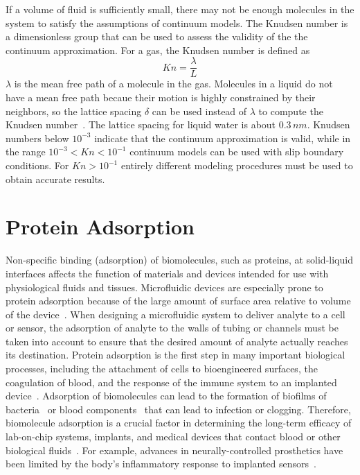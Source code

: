 If a volume of fluid is sufficiently small, there may not be enough
molecules in the system to satisfy the assumptions of continuum models.
The Knudsen number is a dimensionless group that can be used to assess
the validity of the the continuum approximation. For a gas, the Knudsen
number is defined as\[
Kn=\frac{\lambda}{L}\]
$\lambda$ is the mean free path of a molecule in the gas. Molecules
in a liquid do not have a mean free path becaue their motion is highly
constrained by their neighbors, so the lattice spacing $\delta$ can
be used instead of $\lambda$ to compute the Knudsen number~\cite{Sharp2002}.
The lattice spacing for liquid water is about $0.3\, nm$. Knudsen
numbers below $10^{-3}$ indicate that the continuum approximation
is valid, while in the range $10^{-3}<Kn<10^{-1}$ continuum models
can be used with slip boundary conditions. For $Kn>10^{-1}$ entirely
different modeling procedures must be used to obtain accurate results.


\section{Protein Adsorption}

Non-specific binding (adsorption) of biomolecules, such as proteins,
at solid-liquid interfaces affects the function of materials and devices
intended for use with physiological fluids and tissues. Microfluidic
devices are especially prone to protein adsorption because of the
large amount of surface area relative to volume of the device~\cite{Walker2004}.
When designing a microfluidic system to deliver analyte to a cell
or sensor, the adsorption of analyte to the walls of tubing or channels
must be taken into account to ensure that the desired amount of analyte
actually reaches its destination. Protein adsorption is the first
step in many important biological processes, including the attachment
of cells to bioengineered surfaces, the coagulation of blood, and
the response of the immune system to an implanted device~\cite{Rabe2010}.
Adsorption of biomolecules can lead to the formation of biofilms of
bacteria~\cite{Cheng2007} or blood components~\cite{Sun2003} that
can lead to infection or clogging. Therefore, biomolecule adsorption
is a crucial factor in determining the long-term efficacy of lab-on-chip
systems, implants, and medical devices that contact blood or other
biological fluids~\cite{Roach2007,Latour2005,Ramsden2007}. For example,
advances in neurally-controlled prosthetics have been limited by the
body's inflammatory response to implanted sensors~\cite{Lai2007}. 

